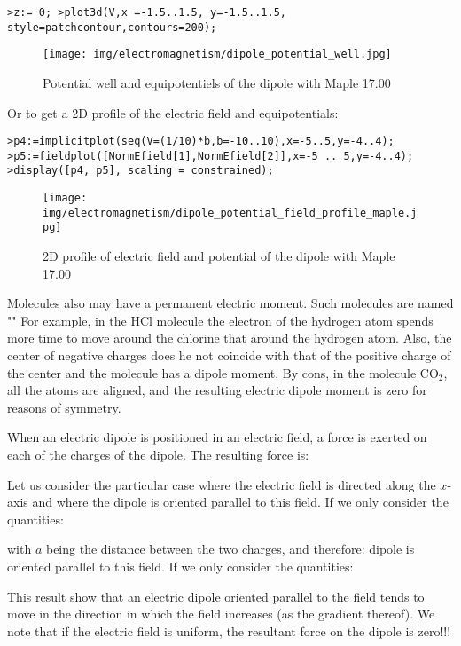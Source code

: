 	\texttt{>z:= 0;
	>plot3d(V,x =-1.5..1.5, y=-1.5..1.5, style=patchcontour,contours=200);
	}

	\begin{figure}[H]
		\centering
		\texttt{[image: img/electromagnetism/dipole\_potential\_well.jpg]}
		\caption{Potential well and equipotentiels of the dipole with Maple 17.00}
	\end{figure}
	Or to get a 2D profile of the electric field and equipotentials:
	
	\texttt{>p4:=implicitplot({seq(V=(1/10)*b,b=-10..10)},x=-5..5,y=-4..4);\\
	>p5:=fieldplot([NormEfield[1],NormEfield[2]],x=-5 .. 5,y=-4..4); 
	\\>display([p4, p5], scaling = constrained);\\
	}
	\begin{figure}[H]
		\centering
		\texttt{[image: img/electromagnetism/dipole\_potential\_field\_profile\_maple.jpg]}
		\caption{2D profile of electric field and potential of the dipole with Maple 17.00}
	\end{figure}
	\begin{tcolorbox}[title=Remark,colframe=black,arc=10pt]
	Molecules also may have a permanent electric moment. Such molecules are named "" For example, in the HCl molecule the electron of the hydrogen atom spends more time to move around the chlorine that around the hydrogen atom. Also, the center of negative charges does he not coincide with that of the positive charge of the center and the molecule has a dipole moment. By cons, in the molecule $\text{CO}_2$, all the atoms are aligned, and the resulting electric dipole moment is zero for reasons of symmetry.
	\end{tcolorbox}
	When an electric dipole is positioned in an electric field, a force is exerted on each of the charges of the dipole. The resulting force is:
	
	Let us consider the particular case where the electric field is directed along the $x$-axis and where the dipole is oriented parallel to this field. If we only consider the quantities:
	
	with $a$ being the distance between the two charges, and therefore:
	dipole is oriented parallel to this field. If we only consider the quantities:
	
	This result show that an electric dipole oriented parallel to the field tends to move in the direction in which the field increases (as the gradient thereof). We note that if the electric field is uniform, the resultant force on the dipole is zero!!!
	
